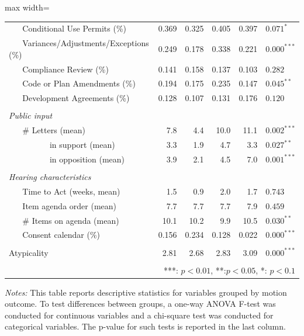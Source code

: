 \begin{table}[H]
\begin{adjustbox}{max width=\textwidth}
\begin{threeparttable}
\begin{tabular}{lrrrrl}
~ ~ Conditional Use Permits (\%) & 0.369 & 0.325 & 0.405 & 0.397 & $0.071^{*}$ \\
~ ~ Variances/Adjustments/Exceptions (\%) & 0.249 & 0.178 & 0.338 & 0.221 & $0.000^{***}$ \\
~ ~ Compliance Review (\%) & 0.141 & 0.158 & 0.137 & 0.103 & $0.282^{}$ \\
~ ~ Code or Plan Amendments (\%) & 0.194 & 0.175 & 0.235 & 0.147 & $0.045^{**}$ \\
~ ~ Development Agreements (\%) & 0.128 & 0.107 & 0.131 & 0.176 & $0.120^{}$ \\
 & & & & & \\
\textit{Public input} & & & & & \\
~ ~ \# Letters (mean) & 7.8 & 4.4 & 10.0 & 11.1 & $0.002^{***}$ \\
~ ~ ~ ~ ~ ~ in support (mean) & 3.3 & 1.9 & 4.7 & 3.3 & $0.027^{**}$ \\
~ ~ ~ ~ ~ ~ in opposition (mean) & 3.9 & 2.1 & 4.5 & 7.0 & $0.001^{***}$ \\
 & & & & & \\
\textit{Hearing characteristics} & & & & & \\
~ ~ Time to Act (weeks, mean) & 1.5 & 0.9 & 2.0 & 1.7 & $0.743^{}$ \\
~ ~ Item agenda order (mean) & 7.7 & 7.7 & 7.7 & 7.9 & $0.459^{}$ \\
~ ~ \# Items on agenda (mean) & 10.1 & 10.2 & 9.9 & 10.5 & $0.030^{**}$ \\
~ ~ Consent calendar (\%) & 0.156 & 0.234 & 0.128 & 0.022 & $0.000^{***}$ \\
 & & & & & \\
Atypicality & 2.81 & 2.68 & 2.83 & 3.09 & $0.000^{***}$ \\

 & & & & & \\
\bottomrule
\multicolumn{6}{r}{***: $p < 0.01$, **:$p < 0.05$, *: $p < 0.1$}
\end{tabular}
\begin{tablenotes}
\item {\textit{Notes: } This table reports descriptive statistics for variables grouped by motion outcome. To test differences between groups, a one-way ANOVA F-test was conducted for continuous variables and a chi-square test was conducted for categorical variables. The p-value for such tests is reported in the last column.}
\end{tablenotes}
\end{threeparttable}
\end{adjustbox}
\end{table}

